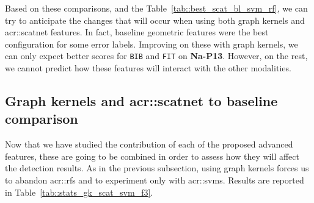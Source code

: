         Based on these comparisons, and the Table~\ref{tab::best_scat_bl_svm_rf}, we can try to anticipate the changes that will occur when using both graph kernels and \gls{acr::scatnet} features.
        In fact, baseline geometric features were the best configuration for some error labels.
        Improving on these with graph kernels, we can only expect better scores for \texttt{BIB} and \texttt{FIT} on \textbf{Na-P13}.
        However, on the rest, we cannot predict how these features will interact with the other modalities.

    \subsection{Graph kernels and \texorpdfstring{\acrshort*{acr::scatnet}}{ScatNet} to baseline comparison}
        \label{subsec::more_experiments::richer_features::graph_kernel_scatnet_baseline}
        Now that we have studied the contribution of each of the proposed advanced features, these are going to be combined in order to assess how they will affect the detection results.
        As in the previous subsection, using graph kernels forces us to abandon \glspl{acr::rf} and to experiment only with \glspl{acr::svm}.
        Results are reported in Table~\ref{tab::stats_gk_scat_svm_f3}.\\
        
